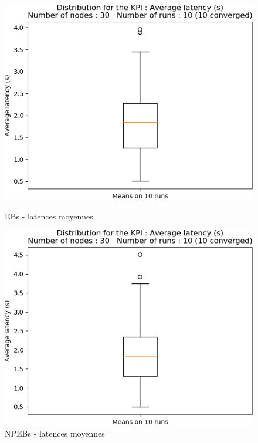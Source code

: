 \documentclass[]{report}
\begin{document}
\begin{figure}[!ht]
	\begin{minipage}{0.49\textwidth}
		\centering
		\includegraphics[width=\textwidth]{results/EB/latency_avg_s}
		\caption{EBs - latences moyennes}
		\label{fig:EBlatence}
	\end{minipage}\hfill
	\begin{minipage}{0.5\textwidth}
		\centering
		\includegraphics[width=\textwidth]{results/NPEB/latency_avg_s}
		\caption{NPEBs - latences moyennes}
		\label{fig:NPEBlatence}
	\end{minipage}	
\end{figure}
\end{document}

